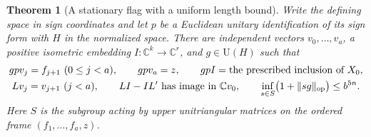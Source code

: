 \documentclass[a4paper,11pt]{article}
\newtheorem{theorem}[proposition]{Theorem}
\theoremstyle{definition}
\theoremstyle{remark}
\numberwithin{equation}{section}
\begin{document}
\begin{theorem}[A stationary flag with a uniform length bound]\leavevmode
\label{thm:effectivestationary695}
Write the defining space in sign coordinates and let \(p\) be
a Euclidean unitary identification of its sign form with \(H\)
in the normalized space. There are independent vectors
\(v_0,\ldots,v_a\), a positive isometric embedding
\(I:\mathbb C^k\to\mathbb C^r\), and \(g\in\mathrm U(H)\)
such that
\[
 \begin{gathered}
  gpv_j=f_{j+1}\ (0\le j<a),\qquad gpv_a=z,\qquad
  gpI=\text{the prescribed inclusion of }X_0,\\
  Lv_j=v_{j+1}\ (j<a),\qquad
  LI-IL'\ \text{has image in }\mathbb Cv_0,\qquad
  \inf_{s\in S}\bigl(1+\|sg\|_{\rm op}\bigr)\le b^{5n}.
 \end{gathered}
\]
Here \(S\) is the subgroup acting by upper unitriangular
matrices on the ordered frame \((f_1,\ldots,f_a,z)\).
\end{theorem}
\end{document}
